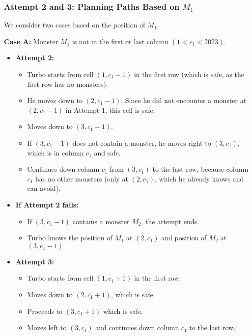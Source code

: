 \begin{tcolorbox}[enhanced, breakable, rounded corners,
    colback=gray!5!white, colframe=gray!75!black,
    colbacktitle=gray!85!black, fonttitle=\bfseries, coltitle=white, title=2024 IMO Problem 5]
\subsubsection*{Attempt 2 and 3: Planning Paths Based on $ M_1 $}

We consider two cases based on the position of $ M_1 $.



\textbf{Case A:} Monster $ M_1 $ is not in the first or last column $( 1 < c_1 < 2023 )$.

\begin{itemize}
    \item \textbf{Attempt 2:}
    \begin{itemize}
        \item Turbo starts from cell $ (1, c_1 - 1) $ in the first row (which is safe, as the first row has no monsters).
        \item He moves down to $ (2, c_1 - 1) $. Since he did not encounter a monster at $ (2, c_1 - 1) $ in Attempt 1, this cell is safe.
        \item Moves down to $ (3, c_1 - 1) $.
        \item If $ (3, c_1 - 1) $ does not contain a monster, he moves right to $ (3, c_1) $, which is in column $ c_1 $ and safe.
        \item Continues down column $ c_1 $ from $ (3, c_1) $ to the last row, because column $ c_1 $ has no other monsters (only at $ (2, c_1) $, which he already knows and can avoid).
    \end{itemize}
    \item \textbf{If Attempt 2 fails:}
    \begin{itemize}
        \item If $ (3, c_1 - 1) $ contains a monster $ M_2 $, the attempt ends.
        \item Turbo knows the position of $ M_1 $ at  $(2,c_1)$ and position of $ M_2 $ at $ (3, c_1 - 1) $
    \end{itemize}
    \item \textbf{Attempt 3:}
    \begin{itemize}
        \item Turbo starts from cell $ (1, c_1 + 1) $ in the first row.
        \item Moves down to $ (2, c_1 + 1) $, which is safe.
        \item Proceeds to $ (3, c_1 + 1) $ which is safe.
        \item Moves left to $ (3, c_1) $ and continues down column $ c_1 $ to the last row.
    \end{itemize}
\end{itemize}


\end{tcolorbox}
